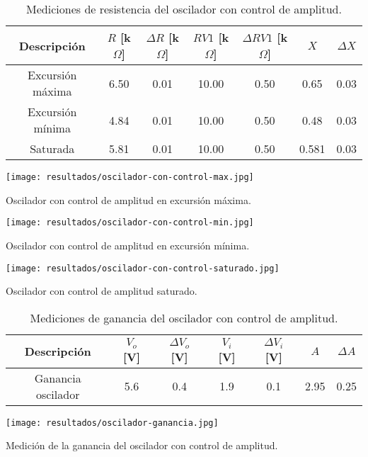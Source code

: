 \begin{table}[ht]
\centering
\begin{tabular}{|c|c|c|c|c|c|c|}
\hline
Descripción & \(R\) [k\(\Omega\)] & \(\Delta R\) [k\(\Omega\)] & \(RV1\) [k\(\Omega\)] & \(\Delta RV1\) [k\(\Omega\)] & \(X\) & \(\Delta X\) \\ \hline
Excursión máxima & 6.50 & 0.01 & 10.00 & 0.50 & 0.65 & 0.03 \\ \hline
Excursión mínima & 4.84 & 0.01 & 10.00 & 0.50 & 0.48 & 0.03 \\ \hline
Saturada & 5.81 & 0.01 & 10.00 & 0.50 & 0.581 & 0.03 \\ \hline
\end{tabular}
\caption{Mediciones de resistencia del oscilador con control de amplitud.}
\label{tab:mediciones-resistencia-oscilador-con-control}
\end{table}

\begin{ilustracion}[ht]
    \centering
    \texttt{[image: resultados/oscilador-con-control-max.jpg]}
    \caption{Oscilador con control de amplitud en excursión máxima.}
    \label{fig:oscilador-con-control-excursion-maxima}
\end{ilustracion}

\begin{ilustracion}[ht]
    \centering
    \texttt{[image: resultados/oscilador-con-control-min.jpg]}
    \caption{Oscilador con control de amplitud en excursión mínima.}
    \label{fig:oscilador-con-control-excursion-minima}
\end{ilustracion}

\begin{ilustracion}[ht]
    \centering
    \texttt{[image: resultados/oscilador-con-control-saturado.jpg]}
    \caption{Oscilador con control de amplitud saturado.}
    \label{fig:oscilador-con-control-saturado}
\end{ilustracion}

\begin{table}[ht]
\centering
\begin{tabular}{|c|c|c|c|c|c|c|}
\hline
Descripción & \(V_o\) [V] & \(\Delta V_o\) [V] & \(V_i\) [V] & \(\Delta V_i\) [V] & \(A\) & \(\Delta A\) \\ \hline
Ganancia oscilador & 5.6 & 0.4 & 1.9 & 0.1 & 2.95 & 0.25 \\ \hline
\end{tabular}
\caption{Mediciones de ganancia del oscilador con control de amplitud.}
\label{tab:mediciones-ganancia-oscilador}
\end{table}

\begin{ilustracion}[ht]
    \centering
    \texttt{[image: resultados/oscilador-ganancia.jpg]}
    \caption{Medición de la ganancia del oscilador con control de amplitud.}
    \label{fig:oscilador-con-control-ganancia}
\end{ilustracion}